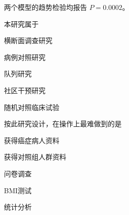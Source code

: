 两个模型的趋势检验均报告 \(P=0.0002\)。


\par\addvspace{8pt}\noindent\begin{minipage}{\linewidth}


本研究属于


\begin{choices}

\item 横断面调查研究

\item 病例对照研究

\item 队列研究

\item 社区干预研究

\item 随机对照临床试验

\end{choices}

\end{minipage}\par\vspace{5pt}

\par\addvspace{8pt}\noindent\begin{minipage}{\linewidth}


按此研究设计，在操作上最难做到的是


\begin{choices}

\item 获得癌症病人资料

\item 获得对照组人群资料

\item 问卷调查

\item BMI测试

\item 统计分析

\end{choices}

\end{minipage}\par\vspace{5pt}

